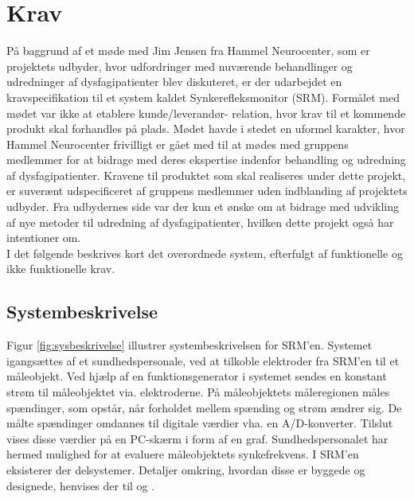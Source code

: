 \chapter{Krav} \label{Af:Krav}

På baggrund af et møde med Jim Jensen fra Hammel Neurocenter, som er projektets udbyder, hvor udfordringer med nuværende behandlinger og udredninger af dysfagipatienter blev diskuteret, er der udarbejdet en kravspecifikation til et system kaldet Synkerefleksmonitor (SRM). Formålet med mødet var ikke at etablere kunde/leverandør- relation, hvor krav til et kommende produkt skal forhandles på plads. Mødet havde i stedet en uformel karakter, hvor Hammel Neurocenter frivilligt er gået med til at mødes med gruppens medlemmer for at bidrage med deres ekspertise indenfor behandling og udredning af dysfagipatienter. Kravene til produktet som skal realiseres under dette projekt, er suverænt udspecificeret af gruppens medlemmer uden indblanding af projektets udbyder. Fra udbydernes side var der kun et ønske om at bidrage med udvikling af nye metoder til udredning af dysfagipatienter, hvilken dette projekt også har intentioner om. \\

I det følgende beskrives kort det overordnede system, efterfulgt af funktionelle og ikke funktionelle krav.  

\section{Systembeskrivelse}



Figur \ref{fig:sysbeskrivelse} illustrer systembeskrivelsen for SRM'en. Systemet igangsættes af et sundhedspersonale, ved at tilkoble elektroder fra SRM'en til et måleobjekt. Ved hjælp af en funktionsgenerator i systemet sendes en konstant strøm til måleobjektet via. elektroderne. På måleobjektets måleregionen måles spændinger, som opstår, når forholdet mellem spænding og strøm ændrer sig. De målte spændinger omdannes til digitale værdier vha.  en A/D-konverter. Tilslut vises disse værdier på en PC-skærm i form af en graf. Sundhedspersonalet har hermed mulighed for at evaluere måleobjektets synkefrekvens. I SRM'en eksisterer der delsystemer. Detaljer omkring, hvordan disse er byggede og designede, henvises der til  og . 

 


 

